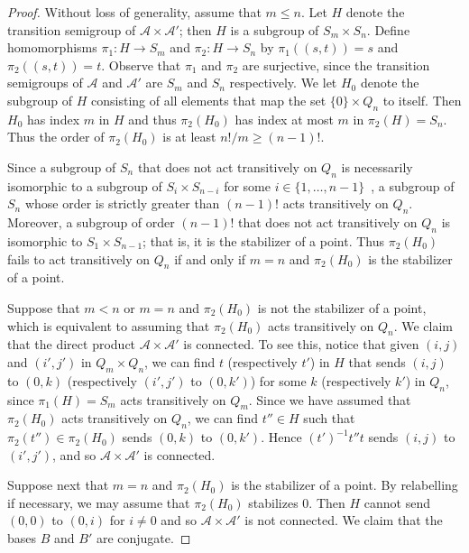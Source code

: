 \documentclass{llncs}
\newcommand{\cA}{{\mathcal A}}
\begin{document}
\begin{proof}
Without loss of generality, assume that $m\le n$.
Let $H$ denote the transition semigroup of $\cA\times \cA'$; then $H$ is a subgroup of $S_m\times S_n$. Define homomorphisms $\pi_1\colon H \to S_m$ and $\pi_2\colon H \to S_n$ by $\pi_1((s,t)) = s$ and $\pi_2((s,t)) = t$. Observe that $\pi_1$ and $\pi_2$ are surjective, since the transition semigroups of $\cA$ and $\cA'$ are $S_m$ and $S_n$ respectively.  We let $H_0$ denote the subgroup of $H$ consisting of all elements that map the set $\{0\}\times Q_n$ to itself.  Then $H_0$ has index $m$ in $H$ and thus $\pi_2(H_0)$ has index at most $m$ in $\pi_2(H)=S_n$.
Thus the order of $\pi_2(H_0)$ is at least $n!/m\ge (n-1)!$.  

Since a subgroup of $S_n$ that does not act transitively on $Q_n$ is necessarily isomorphic to a subgroup of $S_i\times S_{n-i}$ for some $i\in \{1,\ldots ,n-1\}$~\cite[Section 2.5.1]{Wil09},  a subgroup of $S_n$ whose order is strictly greater than $(n-1)!$ acts transitively on $Q_n$.  Moreover, a subgroup of order $(n-1)!$ that does not act transitively on $Q_n$ is isomorphic to $S_1\times S_{n-1}$; that is, it is the stabilizer of a point.  Thus $\pi_2(H_0)$ fails to act transitively on $Q_n$ if and only if $m=n$ and $\pi_2(H_0)$ is the stabilizer of a point. 

Suppose that $m< n$ or $m=n$ and $\pi_2(H_0)$ is not the stabilizer of a point,  which is equivalent to assuming that $\pi_2(H_0)$ acts transitively on $Q_n$.  We claim that the direct product $\cA\times \cA'$ is connected.  To see this, notice that given $(i,j)$ and $(i',j')$ in $Q_m\times Q_n$, we can find $t$ (respectively $t'$) in $H$ that  sends $(i,j)$ to $(0,k)$ (respectively $(i',j')$ to $(0,k')$) for some $k$ (respectively $k'$) in $Q_n$, since $\pi_1(H)=S_m$ acts transitively on $Q_m$.  
Since we have assumed that $\pi_2(H_0)$ acts transitively on $Q_n$, we can find $t'' \in H$ such that $\pi_2(t'')\in \pi_2(H_0)$  sends $(0,k)$ to $(0,k')$. Hence 
$(t')^{-1}t''t$ sends $(i,j)$ to $(i',j')$, and so $\cA\times \cA'$ is connected. 




Suppose next that $m=n$ and $\pi_2(H_0)$ is the stabilizer of a point.   By relabelling if necessary, we may assume that $\pi_2(H_0)$ stabilizes $0$.   Then $H$ cannot send $(0,0)$ to $(0,i)$ for $i\neq 0$ and so $\cA\times \cA'$ is not connected.  We claim that the bases $B$ and $B'$ are conjugate.  


\end{proof}
\end{document}
